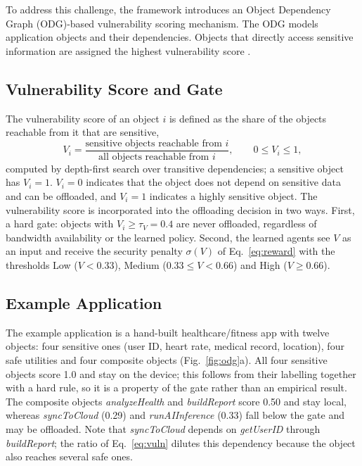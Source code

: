 \documentclass{ieeeaccess}
\begin{document}
To address this challenge, the framework introduces an Object Dependency Graph (ODG)-based vulnerability scoring mechanism. The ODG models application objects and their dependencies. Objects that directly access sensitive information are assigned the highest vulnerability score \cite{zhu2013}.

\subsection{Vulnerability Score and Gate}
The vulnerability score of an object $i$ is defined as the share of the objects reachable from it that are sensitive,
\begin{equation}
V_i = \frac{\text{sensitive objects reachable from } i}{\text{all objects reachable from } i},\qquad 0\le V_i\le1,
\label{eq:vuln}
\end{equation}
computed by depth-first search over transitive dependencies; a sensitive object has $V_i=1$. $V_i=0$ indicates that the object does not depend on sensitive data and can be offloaded, and $V_i=1$ indicates a highly sensitive object. The vulnerability score is incorporated into the offloading decision in two ways. First, a hard gate: objects with $V_i\ge\tau_V=0.4$ are never offloaded, regardless of bandwidth availability or the learned policy. Second, the learned agents see $V$ as an input and receive the security penalty $\sigma(V)$ of Eq.~\eqref{eq:reward} with the thresholds Low ($V<0.33$), Medium ($0.33\le V<0.66$) and High ($V\ge0.66$).

\subsection{Example Application}
The example application is a hand-built healthcare/fitness app with twelve objects: four sensitive ones (user ID, heart rate, medical record, location), four safe utilities and four composite objects (Fig.~\ref{fig:odg}a). All four sensitive objects score 1.0 and stay on the device; this follows from their labelling together with a hard rule, so it is a property of the gate rather than an empirical result. The composite objects \emph{analyzeHealth} and \emph{buildReport} score 0.50 and stay local, whereas \emph{syncToCloud} (0.29) and \emph{runAIInference} (0.33) fall below the gate and may be offloaded. Note that \emph{syncToCloud} depends on \emph{getUserID} through \emph{buildReport}; the ratio of Eq.~\eqref{eq:vuln} dilutes this dependency because the object also reaches several safe ones.
\end{document}
